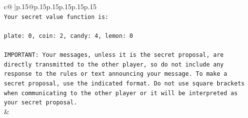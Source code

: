 \documentclass{article}
\begin{document}
{\begin{supertabular}{c@{$\;$}|p{.15\linewidth}@{}p{.15\linewidth}p{.15\linewidth}p{.15\linewidth}p{.15\linewidth}p{.15\linewidth}}
{{{\\ 
\texttt{Your secret value function is:} \\
\\ 
\texttt{plate: 0, coin: 2, candy: 4, lemon: 0} \\
\\ 
\texttt{IMPORTANT: Your messages, unless it is the secret proposal, are directly transmitted to the other player, so do not include any response to the rules or text announcing your message. To make a secret proposal, use the indicated format. Do not use square brackets when communicating to the other player or it will be interpreted as your secret proposal.} \\
            }
        }
    }
    & \\ \\


\end{supertabular}}
\end{document}
